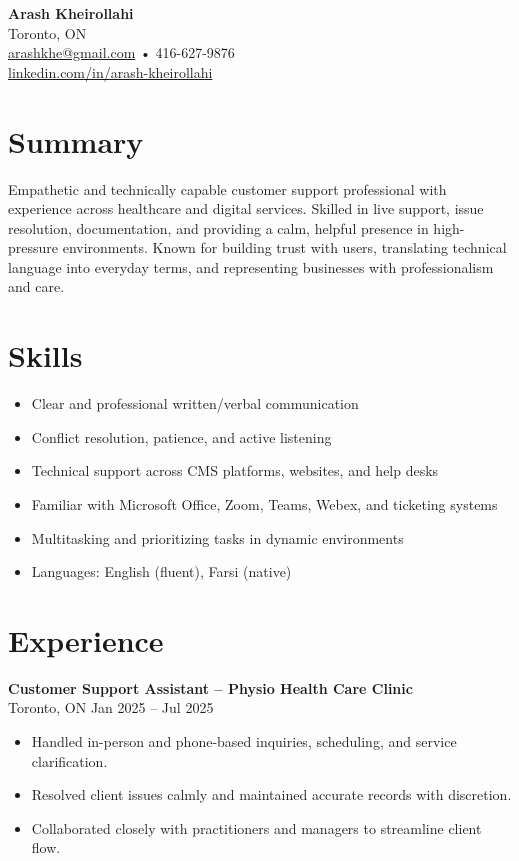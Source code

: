 \documentclass[letterpaper,11pt]{article}
\begin{document}

{\LARGE \textbf{Arash Kheirollahi}}\\[0.2em]
Toronto, ON \\
\href{mailto:arashkhe@gmail.com}{arashkhe@gmail.com} • 416-627-9876 \\
\href{https://linkedin.com/in/arash-kheirollahi}{linkedin.com/in/arash-kheirollahi} 

\vspace{0.8em}

\section*{Summary}
Empathetic and technically capable customer support professional with experience across healthcare and digital services. Skilled in live support, issue resolution, documentation, and providing a calm, helpful presence in high-pressure environments. Known for building trust with users, translating technical language into everyday terms, and representing businesses with professionalism and care.

\section*{Skills}
\begin{itemize}[leftmargin=*]
  \item Clear and professional written/verbal communication
  \item Conflict resolution, patience, and active listening
  \item Technical support across CMS platforms, websites, and help desks
  \item Familiar with Microsoft Office, Zoom, Teams, Webex, and ticketing systems
  \item Multitasking and prioritizing tasks in dynamic environments
  \item Languages: English (fluent), Farsi (native)
\end{itemize}

\section*{Experience}
\textbf{Customer Support Assistant – Physio Health Care Clinic}\\
Toronto, ON \hfill Jan 2025 -- Jul 2025
\begin{itemize}[leftmargin=*]
  \item Handled in-person and phone-based inquiries, scheduling, and service clarification.
  \item Resolved client issues calmly and maintained accurate records with discretion.
  \item Collaborated closely with practitioners and managers to streamline client flow.
\end{itemize}
\end{document}
